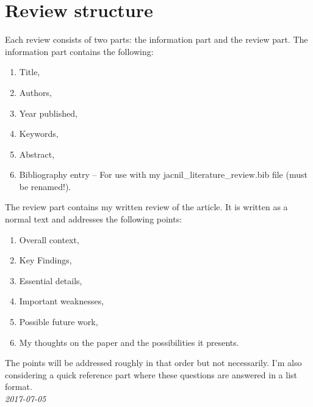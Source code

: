 \documentclass[10pt]{article}
\begin{document}
\begin{minipage}[p]{0.75\textwidth}
\section*{\LARGE Review structure}
    Each review consists of two parts: the information part and the review part.
    The information part contains the following:
    \begin{enumerate}
        \item Title,
        \item Authors,
        \item Year published,
        \item Keywords,
        \item Abstract,
        \item Bibliography entry -- For use with my jacnil\_literature\_review.bib file (must be renamed!).
    \end{enumerate}
    The review part contains my written review of the article.
    It is written as a normal text and addresses the following points:
    \begin{enumerate}
        \item Overall context,
        \item Key Findings,
        \item Essential details,
        \item Important weaknesses,
        \item Possible future work,
        \item My thoughts on the paper and the possibilities it presents.
    \end{enumerate}
    The points will be addressed roughly in that order but not necessarily.
    I'm also considering a quick reference part where these questions are answered in a list format.    
    \vspace{0.3cm}\\
    \-\phantom{OO}\textit{2017-07-05}
\end{minipage}
\newpage
\flushleft


\listofreview

\newpage
\printbibliography
\end{document}
